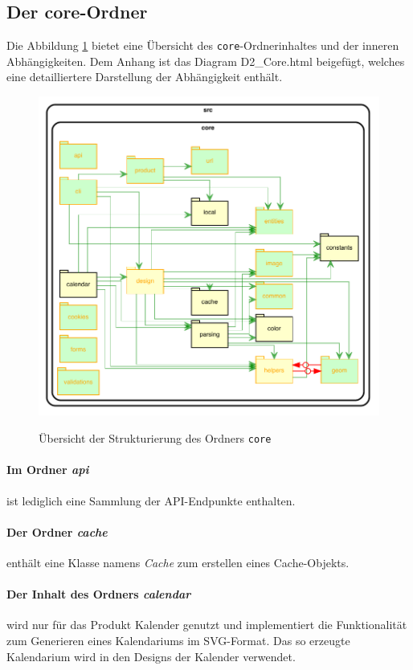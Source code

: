 \subsection{Der core-Ordner}
Die Abbildung \ref{fig:core-sturktur} bietet eine Übersicht des \lstinline|core|-Ordnerinhaltes und der inneren Abhängigkeiten.
Dem Anhang ist das Diagram D2\_Core.html beigefügt, welches eine detailliertere Darstellung der Abhängigkeit enthält.
\begin{figure}[H]
    \centering
    \caption{Übersicht der Strukturierung des Ordners \lstinline|core|}
    \includegraphics[width=.7\textwidth]{diagrams/Ist-Architektur/core-graph.pdf}
    \label{fig:core-sturktur}
\end{figure}
\paragraph{Im Ordner \emph{api}} ist lediglich eine Sammlung der API-Endpunkte enthalten.

\paragraph{Der Ordner \emph{cache}} enthält eine Klasse namens \emph{Cache} zum erstellen eines Cache-Objekts. 

\paragraph{Der Inhalt des Ordners \emph{calendar}} wird nur für das Produkt Kalender genutzt und implementiert die Funktionalität zum Generieren eines Kalendariums im SVG-Format. Das so erzeugte Kalendarium wird in den Designs der Kalender verwendet.

